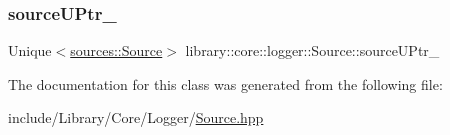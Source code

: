\subsubsection{\texorpdfstring{sourceUPtr\_}{sourceUPtr\_}}
{\footnotesize\ttfamily Unique$<$\mbox{\hyperlink{classlibrary_1_1core_1_1logger_1_1sources_1_1_source}{sources\+::\+Source}}$>$ library\+::core\+::logger\+::\+Source\+::source\+U\+Ptr\+\_\+}



The documentation for this class was generated from the following file\+:\begin{DoxyCompactItemize}
\item 
include/\+Library/\+Core/\+Logger/\mbox{\hyperlink{_source_8hpp}{Source.\+hpp}}\end{DoxyCompactItemize}
